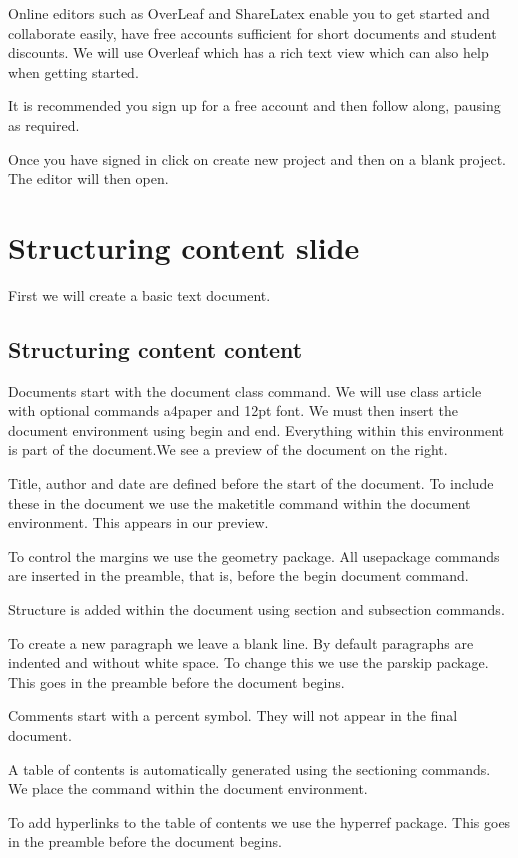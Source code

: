 \documentclass[a4paper,14pt]{extarticle}
\begin{document}
Online editors such as OverLeaf and ShareLatex enable you to get started and collaborate easily, have free accounts sufficient for short documents and student discounts. We will use Overleaf which has a rich text view which can also help when getting started. 

It is recommended you sign up for a free account and then follow along, pausing as required.

Once you have signed in click on create new project and then on a blank project. The editor will then open.

\section{Structuring content slide}

First we will create a basic text document.

\subsection{Structuring content content}

Documents start with the document class command. We will use class article with optional commands a4paper and 12pt font. We must then insert the document environment using begin and end. Everything within this environment is part of the document.We see a preview of the document on the right. 

Title, author and date are defined before the start of the document. To include these in the document we use the maketitle command within the document environment. This appears in our preview. 

To control the margins we use the geometry package. All usepackage commands are inserted in the preamble, that is, before the  begin document command.

Structure is added within the document using section and subsection commands. 

To create a new paragraph we leave a blank line. By default paragraphs are indented and without white space. To change this we use the parskip package. This goes in the preamble before the document begins. 

Comments start with a percent symbol. They will not appear in the final document. 

A table of contents is automatically generated using the sectioning commands. We place the command within the document environment. 

To add hyperlinks to the table of contents we use the hyperref package. This goes in the preamble before the document begins.
\end{document}
